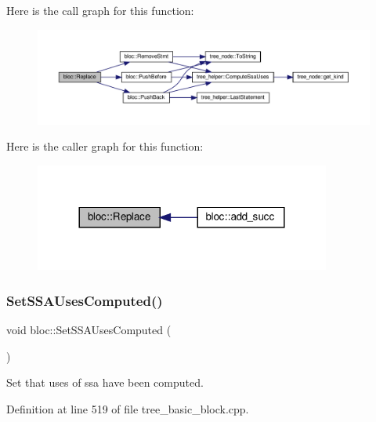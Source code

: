 Here is the call graph for this function\+:
\nopagebreak
\begin{figure}[H]
\begin{center}
\leavevmode
\includegraphics[width=350pt]{d6/df6/structbloc_abe24c6557b28cc9ece43884022766ea8_cgraph}
\end{center}
\end{figure}
Here is the caller graph for this function\+:
\nopagebreak
\begin{figure}[H]
\begin{center}
\leavevmode
\includegraphics[width=276pt]{d6/df6/structbloc_abe24c6557b28cc9ece43884022766ea8_icgraph}
\end{center}
\end{figure}
\mbox{\label{structbloc_ad0095b4227078a8b5709cb80a1f2d2db}} 
\subsubsection{\texorpdfstring{Set\+S\+S\+A\+Uses\+Computed()}{SetSSAUsesComputed()}}
{\footnotesize\ttfamily void bloc\+::\+Set\+S\+S\+A\+Uses\+Computed (\begin{DoxyParamCaption}{ }\end{DoxyParamCaption})}



Set that uses of ssa have been computed. 



Definition at line 519 of file tree\+\_\+basic\+\_\+block.\+cpp.



